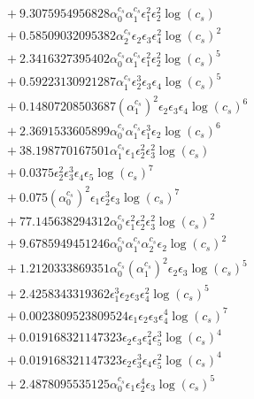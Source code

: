 \documentclass[10pt]{article}
\begin{document}
\begin{align*}
&{}  + 9.3075954956828 \alpha_{0}^{c_s} \alpha_{1}^{c_s} \epsilon_{1}^{2} \epsilon_{2}^{2} \log{\left(c_{s} \right)} \\
&{}  + 0.58509032095382 \alpha_{2}^{c_s} \epsilon_{2} \epsilon_{3} \epsilon_{4}^{2} \log{\left(c_{s} \right)}^{2} \\
&{}  + 2.3416327395402 \alpha_{0}^{c_s} \alpha_{1}^{c_s} \epsilon_{1}^{2} \epsilon_{2}^{2} \log{\left(c_{s} \right)}^{5} \\
&{}  + 0.59223130921287 \alpha_{1}^{c_s} \epsilon_{2}^{3} \epsilon_{3} \epsilon_{4} \log{\left(c_{s} \right)}^{5} \\
&{}  + 0.14807208503687 \left(\alpha_{1}^{c_s}\right)^{2} \epsilon_{2} \epsilon_{3} \epsilon_{4} \log{\left(c_{s} \right)}^{6} \\
&{}  + 2.3691533605899 \alpha_{0}^{c_s} \alpha_{1}^{c_s} \epsilon_{1}^{3} \epsilon_{2} \log{\left(c_{s} \right)}^{6} \\
&{}  + 38.198770167501 \alpha_{1}^{c_s} \epsilon_{1} \epsilon_{2}^{2} \epsilon_{3}^{2} \log{\left(c_{s} \right)} \\
&{}  + 0.0375 \epsilon_{2}^{2} \epsilon_{3}^{3} \epsilon_{4} \epsilon_{5} \log{\left(c_{s} \right)}^{7} \\
&{}  + 0.075 \left(\alpha_{0}^{c_s}\right)^{2} \epsilon_{1} \epsilon_{2}^{3} \epsilon_{3} \log{\left(c_{s} \right)}^{7} \\
&{}  + 77.145638294312 \alpha_{0}^{c_s} \epsilon_{1}^{2} \epsilon_{2}^{2} \epsilon_{3}^{2} \log{\left(c_{s} \right)}^{2} \\
&{}  + 9.6785949451246 \alpha_{0}^{c_s} \alpha_{1}^{c_s} \alpha_{2}^{c_s} \epsilon_{2} \log{\left(c_{s} \right)}^{2} \\
&{}  + 1.2120333869351 \alpha_{0}^{c_s} \left(\alpha_{1}^{c_s}\right)^{2} \epsilon_{2} \epsilon_{3} \log{\left(c_{s} \right)}^{5} \\
&{}  + 2.4258343319362 \epsilon_{1}^{3} \epsilon_{2} \epsilon_{3} \epsilon_{4}^{2} \log{\left(c_{s} \right)}^{5} \\
&{}  + 0.0023809523809524 \epsilon_{1} \epsilon_{2} \epsilon_{3} \epsilon_{4}^{4} \log{\left(c_{s} \right)}^{7} \\
&{}  + 0.019168321147323 \epsilon_{2} \epsilon_{3} \epsilon_{4}^{2} \epsilon_{5}^{3} \log{\left(c_{s} \right)}^{4} \\
&{}  + 0.019168321147323 \epsilon_{2} \epsilon_{3}^{3} \epsilon_{4} \epsilon_{5}^{2} \log{\left(c_{s} \right)}^{4} \\
&{}  + 2.4878095535125 \alpha_{0}^{c_s} \epsilon_{1} \epsilon_{2}^{4} \epsilon_{3} \log{\left(c_{s} \right)}^{5} \\

\end{align*}
\end{document}
